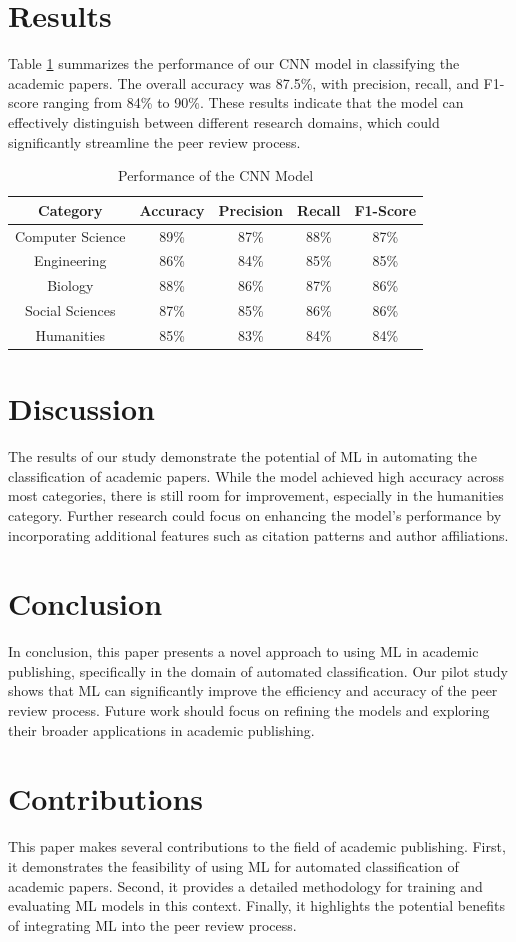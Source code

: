 \documentclass{article}
\begin{document}
\section{Results}
Table \ref{table:results} summarizes the performance of our CNN model in classifying the academic papers. The overall accuracy was 87.5\%, with precision, recall, and F1-score ranging from 84\% to 90\%. These results indicate that the model can effectively distinguish between different research domains, which could significantly streamline the peer review process.

\begin{table}[ht]
\centering
\begin{tabular}{|c|c|c|c|c|}
\hline
Category & Accuracy & Precision & Recall & F1-Score \\
\hline
Computer Science & 89\% & 87\% & 88\% & 87\% \\
Engineering & 86\% & 84\% & 85\% & 85\% \\
Biology & 88\% & 86\% & 87\% & 86\% \\
Social Sciences & 87\% & 85\% & 86\% & 86\% \\
Humanities & 85\% & 83\% & 84\% & 84\% \\
\hline
\end{tabular}
\caption{Performance of the CNN Model}
\label{table:results}
\end{table}

\section{Discussion}
The results of our study demonstrate the potential of ML in automating the classification of academic papers. While the model achieved high accuracy across most categories, there is still room for improvement, especially in the humanities category. Further research could focus on enhancing the model's performance by incorporating additional features such as citation patterns and author affiliations.

\section{Conclusion}
In conclusion, this paper presents a novel approach to using ML in academic publishing, specifically in the domain of automated classification. Our pilot study shows that ML can significantly improve the efficiency and accuracy of the peer review process. Future work should focus on refining the models and exploring their broader applications in academic publishing.

\section{Contributions}
This paper makes several contributions to the field of academic publishing. First, it demonstrates the feasibility of using ML for automated classification of academic papers. Second, it provides a detailed methodology for training and evaluating ML models in this context. Finally, it highlights the potential benefits of integrating ML into the peer review process.
\end{document}
